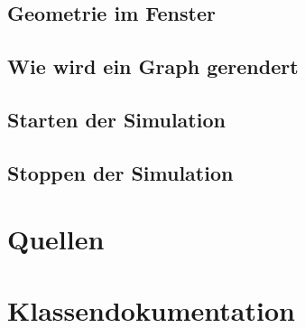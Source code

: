 \documentclass[14pt, a4paper]{report}
\begin{document}
\section{Geometrie im Fenster}
\section{Wie wird ein Graph gerendert}
\section{Starten der Simulation}
\section{Stoppen der Simulation}

\chapter{Quellen}

\appendix
\chapter{Klassendokumentation}
\newpage
\end{document}

